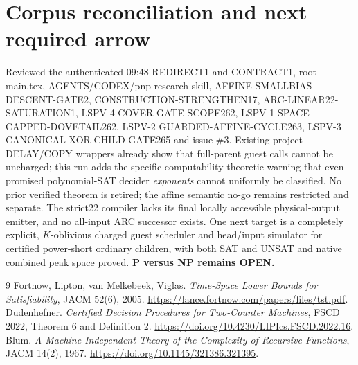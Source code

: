 \documentclass[11pt]{article}
\begin{document}
\section{Corpus reconciliation and next required arrow}
Reviewed the authenticated 09:48 REDIRECT1 and CONTRACT1, root main.tex, AGENTS/CODEX/pnp-research skill, AFFINE-SMALLBIAS-DESCENT-GATE2, CONSTRUCTION-STRENGTHEN17, ARC-LINEAR22-SATURATION1, LSPV-4 COVER-GATE-SCOPE262, LSPV-1 SPACE-CAPPED-DOVETAIL262, LSPV-2 GUARDED-AFFINE-CYCLE263, LSPV-3 CANONICAL-XOR-CHILD-GATE265 and issue \#3. Existing project DELAY/COPY wrappers already show that full-parent guest calls cannot be uncharged; this run adds the specific computability-theoretic warning that even promised polynomial-SAT decider \emph{exponents} cannot uniformly be classified. No prior verified theorem is retired; the affine semantic no-go remains restricted and separate. The strict22 compiler lacks its final locally accessible physical-output emitter, and no all-input ARC successor exists. One next target is a completely explicit, $K$-oblivious charged guest scheduler and head/input simulator for certified power-short ordinary children, with both SAT and UNSAT and native combined peak space proved. \textbf{P versus NP remains OPEN.}
\begin{thebibliography}{9}
 Fortnow, Lipton, van Melkebeek, Viglas. \emph{Time-Space Lower Bounds for Satisfiability}, JACM 52(6), 2005. \url{https://lance.fortnow.com/papers/files/tst.pdf}.
 Dudenhefner. \emph{Certified Decision Procedures for Two-Counter Machines}, FSCD 2022, Theorem 6 and Definition 2. \url{https://doi.org/10.4230/LIPIcs.FSCD.2022.16}.
 Blum. \emph{A Machine-Independent Theory of the Complexity of Recursive Functions}, JACM 14(2), 1967. \url{https://doi.org/10.1145/321386.321395}.
\end{thebibliography}
\end{document}

